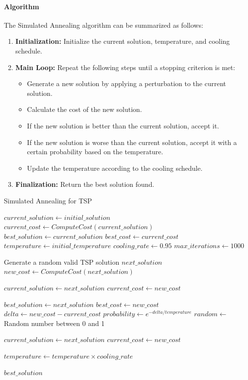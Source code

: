 \documentclass{article}
\begin{document}
\paragraph{Algorithm}
The Simulated Annealing algorithm can be summarized as follows:
\begin{enumerate}
	\item \textbf{Initialization:} Initialize the current solution, temperature, and cooling schedule.
	\item \textbf{Main Loop:} Repeat the following steps until a stopping criterion is met:
	      \begin{itemize}
		      \item Generate a new solution by applying a perturbation to the current solution.
		      \item Calculate the cost of the new solution.
		      \item If the new solution is better than the current solution, accept it.
		      \item If the new solution is worse than the current solution, accept it with a certain probability based on the temperature.
		      \item Update the temperature according to the cooling schedule.
	      \end{itemize}
	\item \textbf{Finalization:} Return the best solution found.
\end{enumerate}


\begin{algorithm}[!ht]
	\caption{Simulated Annealing for TSP}
	\begin{algorithmic}[1]
	\State $current\_solution \gets initial\_solution$
	\State $current\_cost \gets ComputeCost(current\_solution)$
	\State $best\_solution \gets current\_solution$
	\State $best\_cost \gets current\_cost$
	\State $temperature \gets initial\_temperature$
	\State $cooling\_rate \gets 0.95$
	\State $max\_iterations \gets 1000$
	
		\State Generate a random valid TSP solution $next\_solution$
		\State $new\_cost \gets ComputeCost(next\_solution)$
		
			\State $current\_solution \gets next\_solution$
			\State $current\_cost \gets new\_cost$
			
				\State $best\_solution \gets next\_solution$
				\State $best\_cost \gets new\_cost$
			\EndIf
		\Else
			\State $delta \gets new\_cost - current\_cost$
			\State $probability \gets e^{-delta / temperature}$
			\State $random \gets$ Random number between 0 and 1
			
				\State $current\_solution \gets next\_solution$
				\State $current\_cost \gets new\_cost$
			\EndIf
		\EndIf
		
		\State $temperature \gets temperature \times cooling\_rate$
	\EndFor
	
	\State \Return $best\_solution$
	\EndProcedure
	\end{algorithmic}
	\end{algorithm}
\end{document}
